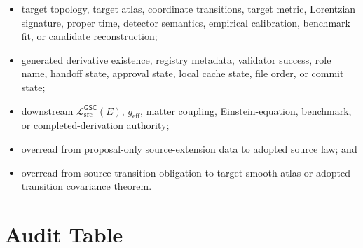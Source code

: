\documentclass[11pt]{article}
\newcommand{\MetricData}{\mathcal{L}_{\mathrm{src}}^{\mathsf{GSC}}}
\newcommand{\geff}{g_{\mathrm{eff}}}
\begin{document}
\begin{itemize}[leftmargin=*]
  \item target topology, target atlas, coordinate transitions, target metric,
  Lorentzian signature, proper time, detector semantics, empirical
  calibration, benchmark fit, or candidate reconstruction;
  \item generated derivative existence, registry metadata, validator success,
  role name, handoff state, approval state, local cache state, file order, or
  commit state;
  \item downstream \(\MetricData(E)\), \(\geff\), matter coupling,
  Einstein-equation, benchmark, or completed-derivation authority;
  \item overread from proposal-only source-extension data to adopted source
  law; and
  \item overread from source-transition obligation to target smooth atlas or
  adopted transition covariance theorem.
\end{itemize}

\section{Audit Table}
\end{document}
